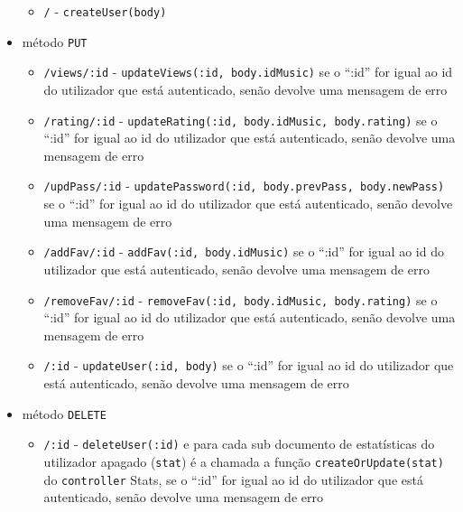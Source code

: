 \documentclass{article}
\begin{document}
\begin{itemize}
\begin{itemize}
                \item \texttt{/} - \texttt{createUser(body)}
            \end{itemize}
        \item método \texttt{PUT}
            \begin{itemize}
                \item \texttt{/views/:id} - \texttt{updateViews(:id, body.idMusic)} se o ``:id'' for igual ao id do utilizador que está autenticado, senão devolve uma mensagem de erro
                \item \texttt{/rating/:id} - \texttt{updateRating(:id, body.idMusic, body.rating)} se o ``:id'' for igual ao id do utilizador que está autenticado, senão devolve uma mensagem de erro
                \item \texttt{/updPass/:id} - \texttt{updatePassword(:id, body.prevPass, body.newPass)} se o ``:id'' for igual ao id do utilizador que está autenticado, senão devolve uma mensagem de erro
                \item \texttt{/addFav/:id} - \texttt{addFav(:id, body.idMusic)} se o ``:id'' for igual ao id do utilizador que está autenticado, senão devolve uma mensagem de erro
                \item \texttt{/removeFav/:id} - \texttt{removeFav(:id, body.idMusic, body.rating)} se o ``:id'' for igual ao id do utilizador que está autenticado, senão devolve uma mensagem de erro
                \item \texttt{/:id} - \texttt{updateUser(:id, body)} se o ``:id'' for igual ao id do utilizador que está autenticado, senão devolve uma mensagem de erro
            \end{itemize}
        \item método \texttt{DELETE}
            \begin{itemize}
                \item \texttt{/:id} - \texttt{deleteUser(:id)} e para cada sub documento de estatísticas do utilizador apagado (\texttt{stat}) é a chamada a função \texttt{createOrUpdate(stat)} do \texttt{controller} Stats, se o ``:id'' for igual ao id do utilizador que está autenticado, senão devolve uma mensagem de erro
            \end{itemize}
    \end{itemize}
\end{document}
